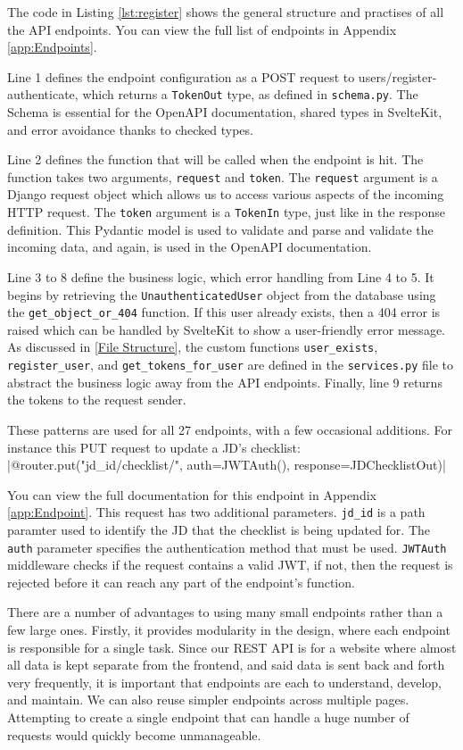 The code in Listing \ref{lst:register} shows the general structure and practises of all the API endpoints. You can view the full list of endpoints in Appendix \ref{app:Endpoints}. 

Line 1 defines the endpoint configuration as a POST request to users/register-authenticate, which returns a \texttt{TokenOut} type, as defined in \texttt{schema.py}. The Schema is essential for the OpenAPI documentation, shared types in SvelteKit, and error avoidance thanks to checked types.

Line 2 defines the function that will be called when the endpoint is hit. The function takes two arguments, \texttt{request} and \texttt{token}. The \texttt{request} argument is a Django request object which allows us to access various aspects of the incoming HTTP request. The \texttt{token} argument is a \texttt{TokenIn} type, just like in the response definition. This Pydantic model is used to validate and parse and validate the incoming data, and again, is used in the OpenAPI documentation.

Line 3 to 8 define the business logic, which error handling from Line 4 to 5. It begins by retrieving the \texttt{UnauthenticatedUser} object from the database using the \texttt{get\_object\_or\_404} function. If this user already exists, then a 404 error is raised which can be handled by SvelteKit to show a user-friendly error message. As discussed in \ref{File Structure}, the custom functions \texttt{user\_exists}, \texttt{register\_user}, and \texttt{get\_tokens\_for\_user} are defined in the \texttt{services.py} file to abstract the business logic away from the API endpoints. Finally, line 9 returns the tokens to the request sender.

These patterns are used for all 27 endpoints, with a few occasional additions. For instance this PUT request to update a JD's checklist:
|@router.put("{jd_id}/checklist/", auth=JWTAuth(), response=JDChecklistOut)|

You can view the full documentation for this endpoint in Appendix \ref{app:Endpoint}. This request has two additional parameters. \texttt{jd\_id} is a path paramter used to identify the JD that the checklist is being updated for. The \texttt{auth} parameter specifies the authentication method that must be used. \texttt{JWTAuth} middleware checks if the request contains a valid JWT, if not, then the request is rejected before it can reach any part of the endpoint's function.

There are a number of advantages to using many small endpoints rather than a few large ones. Firstly, it provides modularity in the design, where each endpoint is responsible for a single task. Since our REST API is for a website where almost all data is kept separate from the frontend, and said data is sent back and forth very frequently, it is important that endpoints are each to understand, develop, and maintain. We can also reuse simpler endpoints across multiple pages. Attempting to create a single endpoint that can handle a huge number of requests would quickly become unmanageable.


